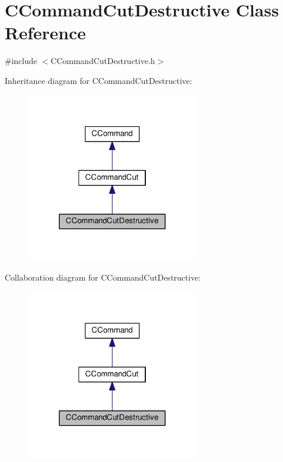 \hypertarget{classCCommandCutDestructive}{}\section{C\+Command\+Cut\+Destructive Class Reference}
\label{classCCommandCutDestructive}


{\ttfamily \#include $<$C\+Command\+Cut\+Destructive.\+h$>$}



Inheritance diagram for C\+Command\+Cut\+Destructive\+:
\nopagebreak
\begin{figure}[H]
\begin{center}
\leavevmode
\includegraphics[width=215pt]{classCCommandCutDestructive__inherit__graph}
\end{center}
\end{figure}


Collaboration diagram for C\+Command\+Cut\+Destructive\+:
\nopagebreak
\begin{figure}[H]
\begin{center}
\leavevmode
\includegraphics[width=215pt]{classCCommandCutDestructive__coll__graph}
\end{center}
\end{figure}

